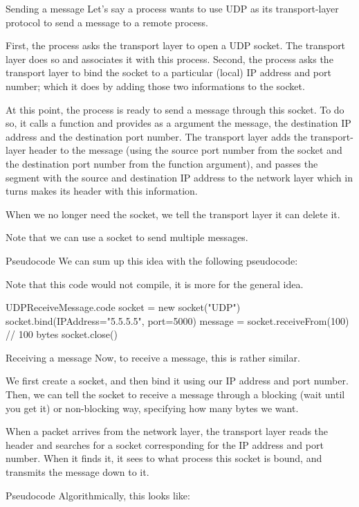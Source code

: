 \documentclass[a4paper]{article}
\begin{document}
\begin{parag}{Sending a message}
    Let's say a process wants to use UDP as its transport-layer protocol to send a message to a remote process. 

    First, the process asks the transport layer to open a UDP socket. The transport layer does so and associates it with this process. Second, the process asks the transport layer to bind the socket to a particular (local) IP address and port number; which it does by adding those two informations to the socket. 

    At this point, the process is ready to send a message through this socket. To do so, it calls a function and provides as a argument the message, the destination IP address and the destination port number. The transport layer adds the transport-layer header to the message (using the source port number from the socket and the destination port number from the function argument), and passes the segment with the source and destination IP address to the network layer which in turns makes its header with this information. 

    When we no longer need the socket, we tell the transport layer it can delete it.

    Note that we can use a socket to send multiple messages.

    \begin{subparag}{Pseudocode}
        We can sum up this idea with the following pseudocode:

        Note that this code would not compile, it is more for the general idea.
    \end{subparag}
\end{parag}

\begin{filecontents*}[overwrite]{UDPReceiveMessage.code}
socket = new socket("UDP")
socket.bind(IPAddress="5.5.5.5", port=5000)
message = socket.receiveFrom(100)  // 100 bytes
socket.close()
\end{filecontents*}

\begin{parag}{Receiving a message}
    Now, to receive a message, this is rather similar. 

    We first create a socket, and then bind it using our IP address and port number. Then, we can tell the socket to receive a message through a blocking (wait until you get it) or non-blocking way, specifying how many bytes we want. 

    When a packet arrives from the network layer, the transport layer reads the header and searches for a socket corresponding for the IP address and port number. When it finds it, it sees to what process this socket is bound, and transmits the message down to it.
    
    \begin{subparag}{Pseudocode}
        Algorithmically, this looks like:
    \end{subparag}
\end{parag}
\end{document}

